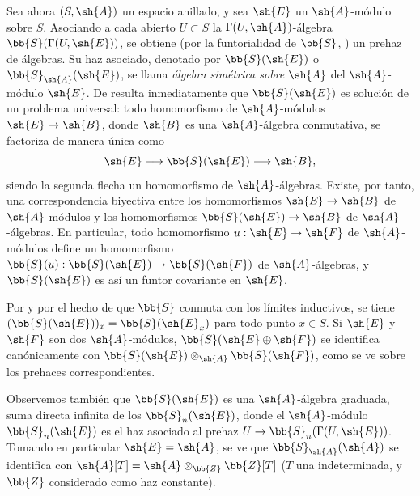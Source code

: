 \documentclass[oneside,10pt]{amsart}
\makeatletter
\newcommand{\ega@arrow}[2]{\mathchoice{#1}{#2}{#2}{#2}}
\renewcommand{\to}{\ega@arrow{\longrightarrow}{\rightarrow}}
\newcommand{\oldpage}[2][]{\marginnote{\normalfont\footnotesize\textbf{#1}~|~#2}\ignorespaces}
\let\EGAOriginalLabel\label
\renewcommand{\label}[1]{\phantomsection\EGAOriginalLabel{#1}}
\makeatother
\begin{document}
\begin{env}[1.7.4]
\label{II.1.7.4}
Sea ahora $(S,\sh{A})$ un espacio anillado, y sea $\sh{E}$ un $\sh{A}$-módulo sobre $S$.
Asociando a cada abierto $U\subset S$ la $\Gamma(U,\sh{A})$-álgebra $\bb{S}(\Gamma(U,\sh{E}))$, se obtiene (por la funtorialidad de $\bb{S}$, ) un prehaz de álgebras.
Su haz asociado, denotado por $\bb{S}(\sh{E})$ o $\bb{S}_\sh{A}(\sh{E})$, se llama \emph{álgebra simétrica sobre $\sh{A}$} del $\sh{A}$-módulo $\sh{E}$.
De  resulta inmediatamente que $\bb{S}(\sh{E})$ es solución de un problema universal: todo homomorfismo de $\sh{A}$-módulos $\sh{E}\to\sh{B}$, donde $\sh{B}$ es una $\sh{A}$-álgebra conmutativa, se factoriza de manera única como
\[
  \sh{E}\to\bb{S}(\sh{E})\to\sh{B},
\]
siendo la segunda flecha un homomorfismo de $\sh{A}$-álgebras.
Existe, por tanto, una correspondencia biyectiva entre los homomorfismos $\sh{E}\to\sh{B}$ de $\sh{A}$-módulos y los homomorfismos $\bb{S}(\sh{E})\to\sh{B}$ de $\sh{A}$-álgebras.
En particular, todo homomorfismo $u:\sh{E}\to\sh{F}$ de $\sh{A}$-módulos define un homomorfismo $\bb{S}(u):\bb{S}(\sh{E})\to\bb{S}(\sh{F})$ de $\sh{A}$-álgebras, y $\bb{S}(\sh{E})$ es así un funtor covariante en $\sh{E}$.

\oldpage[II]{16}
Por  y por el hecho de que $\bb{S}$ conmuta con los límites inductivos, se tiene $(\bb{S}(\sh{E}))_x=\bb{S}(\sh{E}_x)$ para todo punto $x\in S$.
Si $\sh{E}$ y $\sh{F}$ son dos $\sh{A}$-módulos, $\bb{S}(\sh{E}\oplus\sh{F})$ se identifica canónicamente con $\bb{S}(\sh{E})\otimes_\sh{A}\bb{S}(\sh{F})$, como se ve sobre los prehaces correspondientes.

Observemos también que $\bb{S}(\sh{E})$ es una $\sh{A}$-álgebra graduada, suma directa infinita de los $\bb{S}_n(\sh{E})$, donde el $\sh{A}$-módulo $\bb{S}_n(\sh{E})$ es el haz asociado al prehaz $U\to\bb{S}_n(\Gamma(U,\sh{E}))$.
Tomando en particular $\sh{E}=\sh{A}$, se ve que $\bb{S}_\sh{A}(\sh{A})$ se identifica con $\sh{A}[T]=\sh{A}\otimes_\bb{Z}\bb{Z}[T]$ ($T$ una indeterminada, y $\bb{Z}$ considerado como haz constante).
\end{env}
\end{document}
